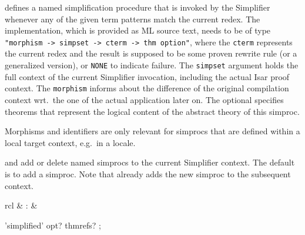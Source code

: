 \begin{isabellebody}
\begin{isamarkuptext}
\begin{descr}
  \item [\hyperlink{command.simproc-setup}{\mbox{\isa{\isacommand{simproc{\isacharunderscore}setup}}}}] defines a named simplification
  procedure that is invoked by the Simplifier whenever any of the
  given term patterns match the current redex.  The implementation,
  which is provided as ML source text, needs to be of type \verb|"morphism -> simpset -> cterm -> thm option"|, where the \verb|cterm| represents the current redex  and the result is
  supposed to be some proven rewrite rule  (or a
  generalized version), or \verb|NONE| to indicate failure.  The
  \verb|simpset| argument holds the full context of the current
  Simplifier invocation, including the actual Isar proof context.  The
  \verb|morphism| informs about the difference of the original
  compilation context wrt.\ the one of the actual application later
  on.  The optional \hyperlink{keyword.identifier}{\mbox{}} specifies theorems that
  represent the logical content of the abstract theory of this
  simproc.

  Morphisms and identifiers are only relevant for simprocs that are
  defined within a local target context, e.g.\ in a locale.

  \item [\isa{{\isachardoublequote}simproc\ add{\isacharcolon}\ name{\isachardoublequote}} and \isa{{\isachardoublequote}simproc\ del{\isacharcolon}\ name{\isachardoublequote}}]
  add or delete named simprocs to the current Simplifier context.  The
  default is to add a simproc.  Note that \hyperlink{command.simproc-setup}{\mbox{}}
  already adds the new simproc to the subsequent context.

  \end{descr}%
\end{isamarkuptext}%
\isamarkuptrue%
%
\isamarkuptrue%
%
\begin{isamarkuptext}%
\begin{matharray}{rcl}
    \hypertarget{attribute.simplified}{\hyperlink{attribute.simplified}{\mbox{}}} & : & \isaratt \\
  \end{matharray}

  \begin{rail}
    'simplified' opt? thmrefs?
    ;


\end{rail}
\end{isamarkuptext}
\end{isabellebody}
